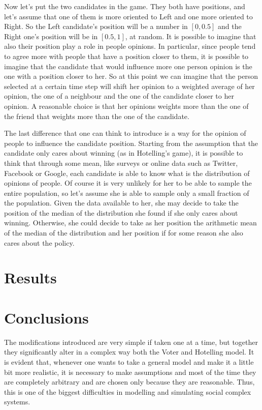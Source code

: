 \documentclass[11pt,a4paper,twocolumn]{article}
\begin{document}
Now let's put the two candidates in the game. They both have positions, and let's assume that one of them is more oriented to Left and one more oriented to Right. So the Left candidate's position will be a number in $[0,0.5]$ and the Right one's position will be in $[0.5,1]$, at random. 
It is possible to imagine that also their position play a role in people opinions. In particular, since people tend to agree more with people that have a position closer to them, it is possible to imagine that the candidate that would influence more one person opinion is the one with a position closer to her.
So at this point we can imagine that the person selected at a certain time step will shift her opinion to a weighted average of her opinion, the one of a neighbour and the one of the candidate closer to her opinion. A reasonable choice is that her opinions weights more than the one of the friend that weights more than the one of the candidate.

The last difference that one can think to introduce is a way for the opinion of people to influence the candidate position.
Starting from the assumption that the candidate only cares about winning (as in Hotelling's game), it is possible to think that through some mean, like surveys or online data such as Twitter, Facebook or Google, each candidate is able to know what is the distribution of opinions of people. Of course it is very unlikely for her to be able to sample the entire population, so let's assume she is able to sample only a small fraction of the population. Given the data available to her, she may decide to take the position of the median of the distribution she found if she only cares about winning. Otherwise, she could decide to take as her position the arithmetic mean of the median of the distribution and her position if for some reason she also cares about the policy.

\section*{Results}

\section*{Conclusions}

The modifications introduced are very simple if taken one at a time, but together they significantly alter in a complex way both the Voter and Hotelling model.
It is evident that, whenever one wants to take a general model and make it a little bit more realistic, it is necessary to make assumptions and most of the time they are completely arbitrary and are chosen only because they are reasonable. Thus, this is one of the biggest difficulties in modelling and simulating social complex systems.
\end{document}
